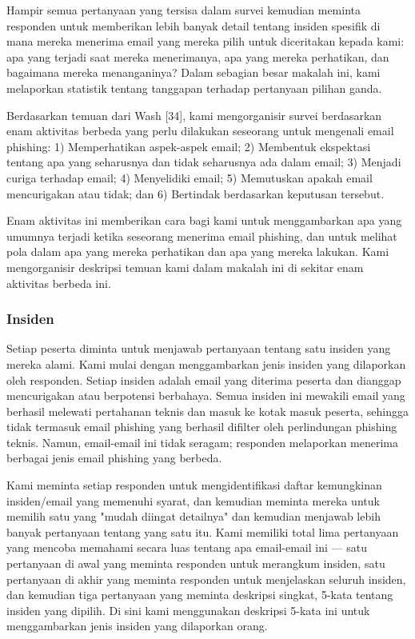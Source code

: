 \documentclass[lettersize,journal]{IEEEtran}
\begin{document}
Hampir semua pertanyaan yang tersisa dalam survei kemudian meminta responden untuk memberikan lebih banyak detail tentang insiden spesifik di mana mereka menerima email yang mereka pilih untuk diceritakan kepada kami: apa yang terjadi saat mereka menerimanya, apa yang mereka perhatikan, dan bagaimana mereka menanganinya? Dalam sebagian besar makalah ini, kami melaporkan statistik tentang tanggapan terhadap pertanyaan pilihan ganda.

Berdasarkan temuan dari Wash [34], kami mengorganisir survei berdasarkan enam aktivitas berbeda yang perlu dilakukan seseorang untuk mengenali email phishing: 1) Memperhatikan aspek-aspek email; 2) Membentuk ekspektasi tentang apa yang seharusnya dan tidak seharusnya ada dalam email; 3) Menjadi curiga terhadap email; 4) Menyelidiki email; 5) Memutuskan apakah email mencurigakan atau tidak; dan 6) Bertindak berdasarkan keputusan tersebut.

Enam aktivitas ini memberikan cara bagi kami untuk menggambarkan apa yang umumnya terjadi ketika seseorang menerima email phishing, dan untuk melihat pola dalam apa yang mereka perhatikan dan apa yang mereka lakukan. Kami mengorganisir deskripsi temuan kami dalam makalah ini di sekitar enam aktivitas berbeda ini.

\subsubsection{Insiden}

Setiap peserta diminta untuk menjawab pertanyaan tentang satu insiden yang mereka alami. Kami mulai dengan menggambarkan jenis insiden yang dilaporkan oleh responden. Setiap insiden adalah email yang diterima peserta dan dianggap mencurigakan atau berpotensi berbahaya. Semua insiden ini mewakili email yang berhasil melewati pertahanan teknis dan masuk ke kotak masuk peserta, sehingga tidak termasuk email phishing yang berhasil difilter oleh perlindungan phishing teknis. Namun, email-email ini tidak seragam; responden melaporkan menerima berbagai jenis email phishing yang berbeda.

Kami meminta setiap responden untuk mengidentifikasi daftar kemungkinan insiden/email yang memenuhi syarat, dan kemudian meminta mereka untuk memilih satu yang "mudah diingat detailnya" dan kemudian menjawab lebih banyak pertanyaan tentang yang satu itu. Kami memiliki total lima pertanyaan yang mencoba memahami secara luas tentang apa email-email ini — satu pertanyaan di awal yang meminta responden untuk merangkum insiden, satu pertanyaan di akhir yang meminta responden untuk menjelaskan seluruh insiden, dan kemudian tiga pertanyaan yang meminta deskripsi singkat, 5-kata tentang insiden yang dipilih. Di sini kami menggunakan deskripsi 5-kata ini untuk menggambarkan jenis insiden yang dilaporkan orang.
\end{document}
